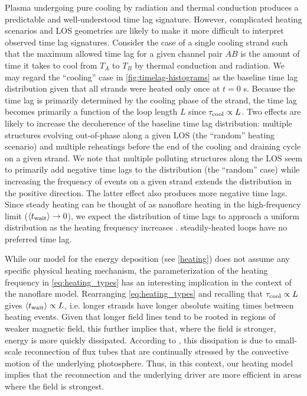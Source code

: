 Plasma undergoing pure cooling by radiation and thermal conduction produces a predictable and well-understood time lag signature. However, complicated heating scenarios and LOS geometries are likely to make it more difficult to interpret observed time lag signatures. Consider the case of a single cooling strand such that the maximum allowed time lag for a given channel pair $AB$ is the amount of time it takes to cool from $T_A$ to $T_B$ by thermal conduction and radiation. We may regard the ``cooling'' case in \autoref{fig:timelag-histograms} as the baseline time lag distribution given that all strands were heated only once at $t=0$ s. Because the time lag is primarily determined by the cooling phase of the strand, the time lag becomes primarily a function of the loop length $L$ since $\tau_\textup{cool}\propto L$. Two effects are likely to increase the decoherence of the baseline time lag distribution: multiple structures evolving out-of-phase along a given LOS (the ``random'' heating scenario) and multiple reheatings before the end of the cooling and draining cycle on a given strand. We note that multiple polluting structures along the LOS seem to primarily add negative time lags to the distribution (the ``random'' case) while increasing the frequency of events on a given strand extends the distribution in the positive direction. The latter effect also produces more negative time lags. Since steady heating can be thought of as nanoflare heating in the high-frequency limit ($\langle t_{\textup{wait}}\rangle\to0$), we expect the distribution of time lags to approach a uniform distribution as the heating frequency increases  \citep{viall_signatures_2016}.   steadily-heated loops have no preferred time lag.

While our model for the energy deposition (see \autoref{heating}) does not assume any specific physical heating mechanism, the parameterization of the heating frequency in \autoref{eq:heating_types} has an interesting implication in the context of the \citet{parker_nanoflares_1988} nanoflare model. Rearranging \autoref{eq:heating_types} and recalling that $\tau_\textup{cool}\propto L$ gives $\langle t_{\textup{wait}}\rangle\propto L$, i.e. longer strands have longer absolute waiting times between heating events. Given that longer field lines tend to be rooted in regions of weaker magnetic field, this further implies that, where the field is stronger, energy is more quickly dissipated. According to \citet{parker_nanoflares_1988}, this dissipation is due to small-scale reconnection of flux tubes that are continually stressed by the convective motion of the underlying photosphere. Thus, in this context, our heating model implies that the reconnection and the underlying driver are more efficient in areas where the field is strongest.

